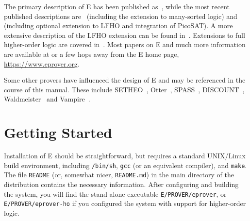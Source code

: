 \documentclass{report}
\begin{document}
The primary description of E has been published
as~\cite{Schulz:AICOM-2002}, while the most recent published
descriptions are~\cite{Schulz:LPAR-2013} (including the extension to
many-sorted logic) and~\cite{SCV:CADE-2019} (including optional
extension to LFHO and integration of PicoSAT). A more extensive
description of the LFHO extension can be found
in~\cite{VBCS:TACAS-2019,VBCS:STTT-2021}. Extensions to full higher-order
logic are covered in~\cite{VBS:TACAS-2023}. Most papers on E and
much more information are available at or a few hops away from the E
home page, \url{https://www.eprover.org}.

Some other provers have influenced the design of E and may be
referenced in the course of this manual. These include
SETHEO~\cite{MILSGSM:JAR-97},
Otter~\cite{Mc94,MW:JAR-97},
SPASS~\cite{WGR96,WABCEKTT:CADE-99},
DISCOUNT~\cite{DKS97}, Waldmeister~\cite{BHF96,HJL:CADE-99} and
Vampire~\cite{RV:AICOM-2002,RV:IJCAR-2001,KV:CAV-2013}.


\chapter{Getting Started}
\label{sec:start}

Installation of E should be straightforward, but requires a standard
UNIX/Linux build environment, including \texttt{/bin/sh}, \texttt{gcc}
(or an equivalent compiler), and \texttt{make}. The file
\texttt{README} (or, somewhat nicer, \texttt{README.md}) in the main
directory of the distribution contains the necessary
information. After configuring and building the system, you will find
the stand-alone executable \texttt{E/PROVER/eprover}, or
\texttt{E/PROVER/eprover-ho} if you configured the system with support
for higher-order logic.
\end{document}
